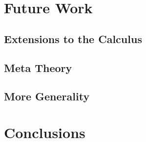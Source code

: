\documentclass[screen,nonacm]{acmart}
\begin{document}
\section{Future Work}\label{sec:wrk}

\subsection{Extensions to the Calculus}\label{sec:wrk-ext}
\subsection{Meta Theory}\label{sec:wrk-prp}
\subsection{More Generality}\label{sec:wrk-prp}

\section{Conclusions}\label{sec:con}



\end{document}
